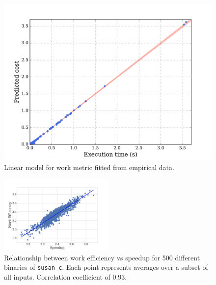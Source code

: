     \begin{figure}[t]
        \centering
        \includegraphics[width=0.6\linewidth]{figs/cost-model.pdf}
        \caption{
            Linear model for work metric fitted from empirical data.
        }
        \label{fig:cost-model}
    \end{figure}

    \begin{figure}[t]
        \centering
        \includegraphics[width=0.5\textwidth]{figs/motivation-work-efficiency.pdf}
        \caption{Relationship between work efficiency vs speedup for 500 different binaries of \texttt{susan\_c}.
                Each point represents averages over a subset of all inputs.
                Correlation coefficient of $0.93$.}
        \label{fig:motivation-work-efficiency}
    \end{figure}
